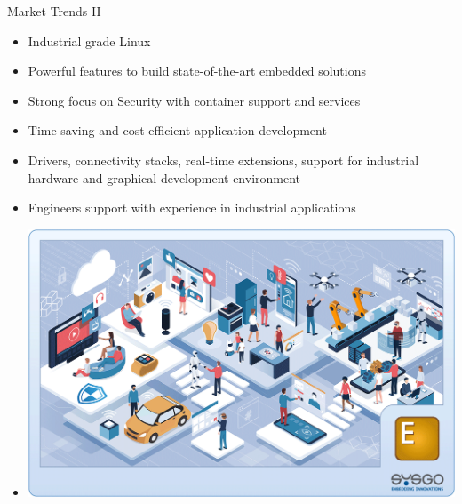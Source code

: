 \begin{frame}{Market Trends II}
    \begin{itemize}
        \item Industrial grade Linux
        \item Powerful features to build state-of-the-art embedded solutions
        \item Strong focus on Security with container support and services
        \item Time-saving and cost-efficient application development
        \item Drivers, connectivity stacks, real-time extensions, support for industrial hardware and graphical development environment
        \item Engineers support with experience in industrial applications
    \end{itemize}
    \begin{itemize}
        \item \centering \includegraphics[scale=0.15]{trainingmaterials/rpibasics/SYSGO_graphic_elinos_embedded_linux.png}
    \end{itemize}
\end{frame}


